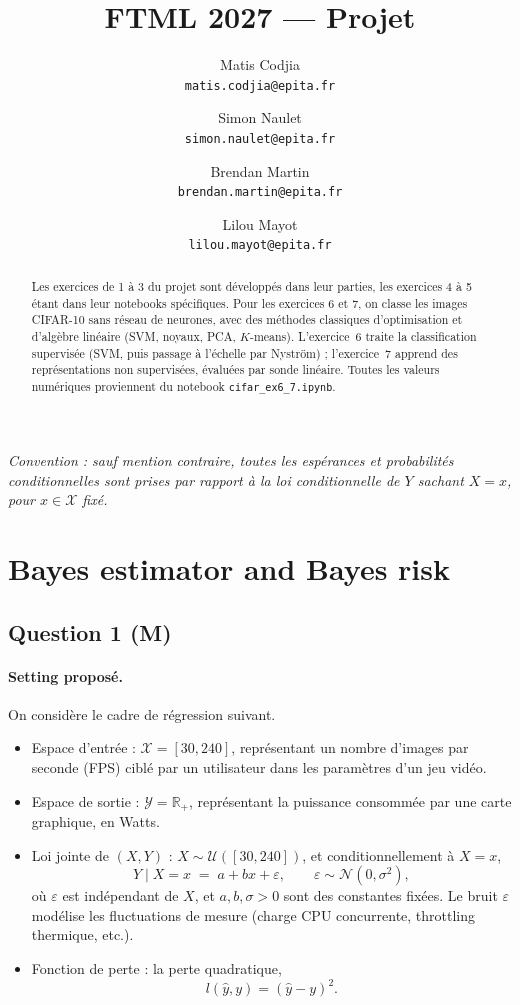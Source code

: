 \documentclass[11pt]{article}
\title{\textbf{FTML 2027 --- Projet}\\[0.3em]}
\author{Matis Codjia\\ \texttt{matis.codjia@epita.fr}
	\and
	Simon Naulet\\ \texttt{simon.naulet@epita.fr}
	\and
	Brendan Martin\\ \texttt{brendan.martin@epita.fr}
	\and
	Lilou Mayot\\ \texttt{lilou.mayot@epita.fr}}
\date{}
\theoremstyle{remark}
\newcommand{\X}{\mathcal{X}}
\newcommand{\Y}{\mathcal{Y}}
\newcommand{\R}{\mathbb{R}}
\begin{document}
	\maketitle
	\vspace{-2em}
	
	\begin{abstract}
		\noindent Les exercices de 1 à 3 du projet sont développés dans leur parties, les exercices 4 à 5 étant dans leur notebooks spécifiques. Pour les exercices 6 et 7, on classe les images CIFAR-10 sans réseau de neurones, avec des
		méthodes classiques d'optimisation et d'algèbre linéaire (SVM, noyaux, PCA,
		$K$-means). L'exercice~6 traite la classification supervisée (SVM, puis passage à
		l'échelle par Nyström) ; l'exercice~7 apprend des représentations non supervisées,
		évaluées par sonde linéaire. Toutes les valeurs numériques proviennent du notebook
		\texttt{cifar\_ex6\_7.ipynb}.
	\end{abstract}
	
	\tableofcontents
	
	\bigskip
	\noindent\textit{Convention : sauf mention contraire, toutes les espérances et probabilités conditionnelles sont prises par rapport à la loi conditionnelle de $Y$ sachant $X=x$, pour $x \in \X$ fixé.}
	
	\section{Bayes estimator and Bayes risk}
	
	\subsection*{Question 1 (M)}
	
	\paragraph{Setting proposé.}
	On considère le cadre de régression suivant.
	
	\begin{itemize}
		\item Espace d'entrée : $\X = [30, 240]$, représentant un nombre d'images par seconde (FPS) ciblé par un utilisateur dans les paramètres d'un jeu vidéo.
		\item Espace de sortie : $\Y = \R_+$, représentant la puissance consommée par une carte graphique, en Watts.
		\item Loi jointe de $(X,Y)$ : $X \sim \mathcal{U}([30,240])$, et conditionnellement à $X=x$,
		\[
		Y \mid X = x \;=\; a + bx + \varepsilon, \qquad \varepsilon \sim \mathcal{N}(0, \sigma^2),
		\]
		où $\varepsilon$ est indépendant de $X$, et $a, b, \sigma > 0$ sont des constantes fixées. Le bruit $\varepsilon$ modélise les fluctuations de mesure (charge CPU concurrente, throttling thermique, etc.).
		\item Fonction de perte : la perte quadratique,
		\[
		l(\hat y, y) = (\hat y - y)^2.
		\]
	\end{itemize}
	
\end{document}
